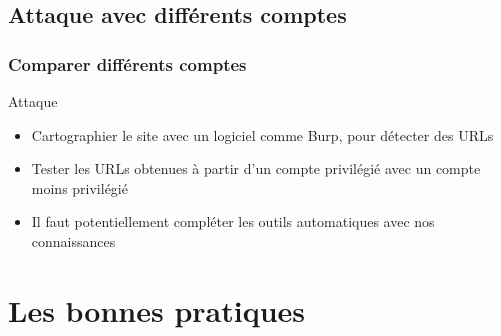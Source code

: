 \documentclass[aspectratio=169]{beamer}  %
\begin{document}
\subsection{Attaque avec différents comptes}

\begin{frame}
  \frametitle{Comparer différents comptes}
  \begin{alertblock}{Attaque}
    \begin{itemize}
      \item Cartographier le site avec un logiciel comme Burp, pour détecter des URLs
      \item Tester les URLs obtenues à partir d'un compte privilégié avec un compte moins privilégié
      \item Il faut potentiellement compléter les outils automatiques avec nos connaissances
    \end{itemize}
  \end{alertblock}
\end{frame}


\section{Les bonnes pratiques}
\end{document}
